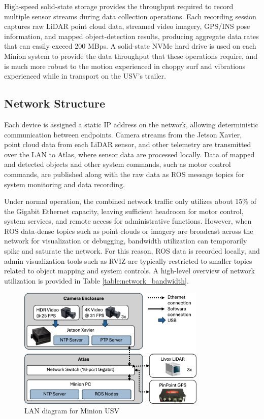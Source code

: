 \documentclass{erauthesis}
\begin{document}
High-speed solid-state storage provides the throughput required to record multiple sensor streams during data collection operations.
Each recording session captures raw \ac{LiDAR} point cloud data, streamed video imagery, GPS/INS pose information, and mapped object-detection results, producing aggregate data rates that can easily exceed 200 \ac{MBps}.
A solid-state NVMe hard drive is used on each Minion system to provide the data throughput that these operations require, and is much more robust to the motion experienced in choppy surf and vibrations experienced while in transport on the \ac{USV}'s trailer.


\subsection{Network Structure} \label{comp:network}

Each device is assigned a static IP address on the network, allowing deterministic communication between endpoints.
Camera streams from the Jetson Xavier, point cloud data from each LiDAR sensor, and other telemetry are transmitted over the LAN to Atlas, where sensor data are processed locally.
Data of mapped and detected objects and other system commands, such as motor control commands, are published along with the raw data as \ac{ROS} message topics for system monitoring and data recording.

Under normal operation, the combined network traffic only utilizes about 15\% of the Gigabit Ethernet capacity, 
leaving sufficient headroom for motor control, system services, and remote access for administrative functions.
However, when \ac{ROS} data-dense topics such as point clouds or imagery are broadcast across the network for visualization or debugging, bandwidth utilization can temporarily spike and saturate the network.
For this reason, ROS data is recorded locally, and admin visualization tools such as RVIZ are typically restricted to smaller topics related to object mapping and system controls.
A high-level overview of network utilization is provided in Table \ref{table:network_bandwidth}.

\begin{figure}[htbp]
\centering
\includegraphics[width=0.8\textwidth]{Images/network_diagram2.png}
\caption{LAN diagram for Minion USV}
\label{fig:network_diagram}
\end{figure}
\end{document}

